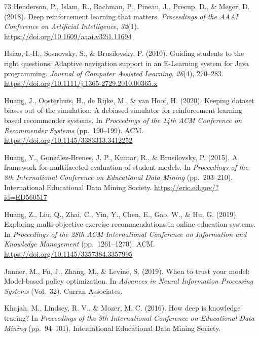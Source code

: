 \documentclass[a4paper,preprint,12pt,authoryear]{elsarticle}
\begin{document}
\begin{thebibliography}{73}
Henderson, P., Islam, R., Bachman, P., Pineau, J., Precup, D., \& Meger, D. (2018). Deep reinforcement learning that matters. \textit{Proceedings of the AAAI Conference on Artificial Intelligence}, \textit{32}(1). \url{https://doi.org/10.1609/aaai.v32i1.11694}

Hsiao, I.-H., Sosnovsky, S., \& Brusilovsky, P. (2010). Guiding students to the right questions: Adaptive navigation support in an E-Learning system for Java programming. \textit{Journal of Computer Assisted Learning}, \textit{26}(4), 270--283. \url{https://doi.org/10.1111/j.1365-2729.2010.00365.x}

Huang, J., Oosterhuis, H., de Rijke, M., \& van Hoof, H. (2020). Keeping dataset biases out of the simulation: A debiased simulator for reinforcement learning based recommender systems. In \textit{Proceedings of the 14th ACM Conference on Recommender Systems} (pp.~190--199). ACM. \url{https://doi.org/10.1145/3383313.3412252}

Huang, Y., Gonz{\'a}lez-Brenes, J. P., Kumar, R., \& Brusilovsky, P. (2015). A framework for multifaceted evaluation of student models. In \textit{Proceedings of the 8th International Conference on Educational Data Mining} (pp.~203--210). International Educational Data Mining Society. \url{https://eric.ed.gov/?id=ED560517}

Huang, Z., Liu, Q., Zhai, C., Yin, Y., Chen, E., Gao, W., \& Hu, G. (2019). Exploring multi-objective exercise recommendations in online education systems. In \textit{Proceedings of the 28th ACM International Conference on Information and Knowledge Management} (pp.~1261--1270). ACM. \url{https://doi.org/10.1145/3357384.3357995}

Janner, M., Fu, J., Zhang, M., \& Levine, S. (2019). When to trust your model: Model-based policy optimization. In \textit{Advances in Neural Information Processing Systems} (Vol.~32). Curran Associates.

Khajah, M., Lindsey, R. V., \& Mozer, M. C. (2016). How deep is knowledge tracing? In \textit{Proceedings of the 9th International Conference on Educational Data Mining} (pp.~94--101). International Educational Data Mining Society.


\end{thebibliography}
\end{document}
